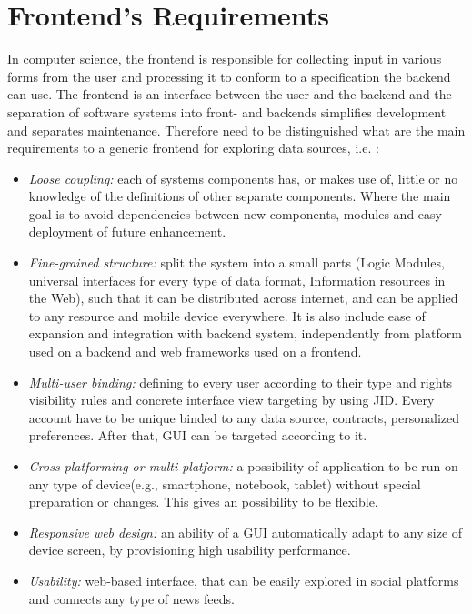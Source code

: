 \section {Frontend's Requirements}
	In computer science, the frontend is responsible for collecting input in various forms from the user and processing it to conform to a specification the backend can use. The frontend is an interface between the user and the backend\cite{wiki:xxx} and the separation of software systems into front- and backends simplifies development and separates maintenance. Therefore need to be distinguished what are the main requirements to a generic frontend for exploring data sources, i.e. :
\begin{itemize}

\item \emph{Loose coupling:} each of systems components has, or makes use of, little or no knowledge of the definitions of other 
       separate components. Where the main goal is to avoid dependencies between new components, modules and easy deployment of future enhancement.
\item \emph{Fine-grained structure:} split the system into a small parts (Logic Modules, universal interfaces for every type of data 
      format, Information resources in the Web), such that it can be distributed across internet, and can be applied to any resource and mobile device everywhere. It is also include ease of expansion and integration with backend system, independently from platform used on a backend and web frameworks used on a frontend.
\item \emph{Multi-user binding:} defining to every user according to their type and rights visibility rules and concrete interface view  
       targeting by using JID. Every account have to be unique binded to any data source, contracts, personalized preferences. After that, GUI can be targeted according to it.
\item \emph{Cross-platforming or multi-platform:} a possibility of application to be run on any type of device(e.g., smartphone, notebook, tablet) without special preparation or changes. This gives an possibility to be flexible.
\item \emph{Responsive web design:} an ability of a GUI automatically adapt to any size of device screen, by provisioning high usability performance.
\item \emph{Usability:} web-based interface, that can be easily explored in social platforms and connects any type of news feeds.
\end{itemize} 

